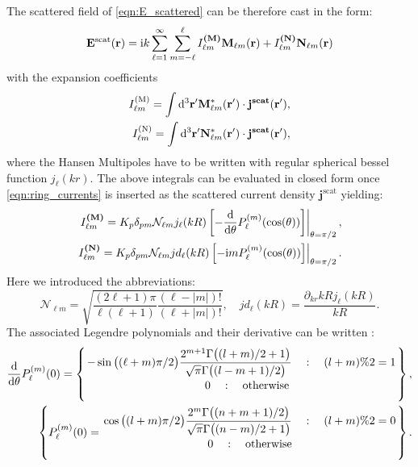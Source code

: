 The scattered field of \cref{eqn:E_scattered} can be therefore cast in the form:
\begin{equation}
\mathbf{E}^\text{scat}(\mathbf{r}) = \mathrm{i} k \sum_{\ell=1}^\infty  \sum_{m=-\ell}^\ell
I_{\ell m}^\textbf{(M)}\mathbf{M}_{\ell m}(\mathbf{r})+
I_{\ell m}^\textbf{(N)}\mathbf{N}_{\ell m}(\mathbf{r})
\label{eqn:Escat}
\end{equation}
with the expansion coefficients
\begin{align}
I_{\ell m}^\text{(M)} = \int \mathrm{d}^3\mathbf{r}' \mathbf{M}^*_{\ell m}(\mathbf{r}')\cdot
\mathbf{j}^\textbf{scat}(\mathbf{r}'),\\
I_{\ell m}^\text{(N)} = \int \mathrm{d}^3\mathbf{r}' \mathbf{N}^*_{\ell m}(\mathbf{r}')\cdot
\mathbf{j}^\textbf{scat}(\mathbf{r}'),
\end{align}
where the Hansen Multipoles have to be written with regular spherical bessel function $j_\ell(kr)$. The above integrals can be evaluated in closed form once \cref{eqn:ring_currents} is inserted as the scattered current density $\mathbf{j}^\text{scat}$ yielding:
\begin{align}
\left.I_{\ell m}^\textbf{(M)} = K_p\delta_{p m} \mathcal{N}_{\ell m} j_\ell(kR)\left[-\frac{\displaystyle\mathrm{d}}{\mathrm{d} \theta}P_{\ell}^{(m)}(\cos(\theta))
\right]\right \vert_{\theta=\pi/2},\\
\left.I_{\ell m}^\textbf{(N)} =  K_p \delta_{p m} \mathcal{N}_{\ell m}jd_\ell(kR)
\left[-\mathrm{i} m 
P_\ell^{(m)}(\cos(\theta)) \right]\right\vert_{\theta=\pi/2}.
\end{align}
Here we introduced the abbreviations:
\begin{equation}
\mathcal{N}_{\ell m} = \sqrt{\frac{(2\ell+1)\pi}{\ell(\ell+1)}\frac{(\ell-|m|)!}{(\ell+|m|)!}},\quad
jd_\ell(kR) = \frac{\partial_{kr}  kR j_\ell(kR)}{kR}.
\end{equation}
The associated Legendre polynomials and their derivative can be written \Cite{Leong1997}:
\begin{align}
\frac{\rd}{\rd \theta}P_\ell^{(m)}(0) =\left\{\ontop{}{}{
-\sin\big((\ell+m)\pi/2\big)\dfrac{2^{m+1}\Gamma\big((l+m)/2+1\big)}{\sqrt{\pi}\Gamma\big((l-m+1)/2\big) }
\quad : \quad (l+m)\%2=1}{\quad0\quad: \quad\text{otherwise}}\right\},
\label{eqn:Plm0diff}
\\\left\{
P_\ell^{(m)}(0) = \ontop{}{}{\cos\big((l+m)\pi/2\big)\dfrac{2^m \Gamma\big((n+m+1)/2\big)}{\sqrt{\pi}\Gamma\big((n-m)/2+1\big)}\quad:\quad (l+m)\%2=0}{0\quad:\quad \text{otherwise}}\right\}.
\label{eqn:Plm0}
\end{align}
